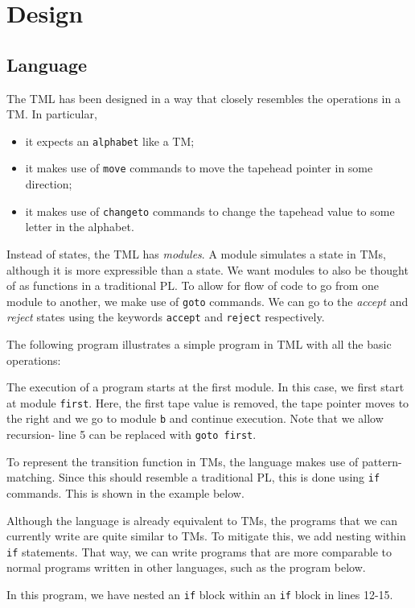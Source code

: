 \chapter{Design}
\section{Language}

The TML has been designed in a way that closely resembles the operations in a TM. In particular, 
\begin{itemize}
    \item it expects an \texttt{alphabet} like a TM;
    \item it makes use of \texttt{move} commands to move the tapehead pointer in some direction;
    \item it makes use of \texttt{changeto} commands to change the tapehead value to some letter in the alphabet.
\end{itemize}
Instead of states, the TML has \emph{modules}. A module simulates a state in TMs, although it is more expressible than a state. We want modules to also be thought of as functions in a traditional PL. To allow for flow of code to go from one module to another, we make use of \texttt{goto} commands. We can go to the \textit{accept} and \textit{reject} states using the keywords \texttt{accept} and \texttt{reject} respectively.

The following program illustrates a simple program in TML with all the basic operations:

The execution of a program starts at the first module. In this case, we first start at module \texttt{first}. Here, the first tape value is removed, the tape pointer moves to the right and we go to module \texttt{b} and continue execution. Note that we allow recursion- line 5 can be replaced with \texttt{goto first}.

To represent the transition function in TMs, the language makes use of pattern-matching. Since this should resemble a traditional PL, this is done using \texttt{if} commands. This is shown in the example below.


Although the language is already equivalent to TMs, the programs that we can currently write are quite similar to TMs. To mitigate this, we add nesting within \texttt{if} statements. That way, we can write programs that are more comparable to normal programs written in other languages, such as the program below.

In this program, we have nested an \texttt{if} block within an \texttt{if} block in lines 12-15.

